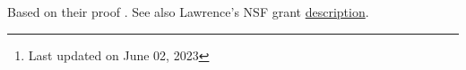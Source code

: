 \documentclass[a4paper, twoside]{article}
\title{\tbf{Lawrence-Venkatesh method}}
\author{Cong Wen, 09/2023}
\date{}
\begin{document}
\maketitle
\thispagestyle{empty}
\begin{abstract}
	This is my self-use notes\footnote{Last updated on June 02, 2023} on .


	Please reach out if you find anything incorrect.
\end{abstract}
\tableofcontents


Based on their proof \cite{LV2020}. See also Lawrence's NSF grant \href{https://www.nsf.gov/awardsearch/showAward?AWD_ID=2313466}{description}.
\end{document}
